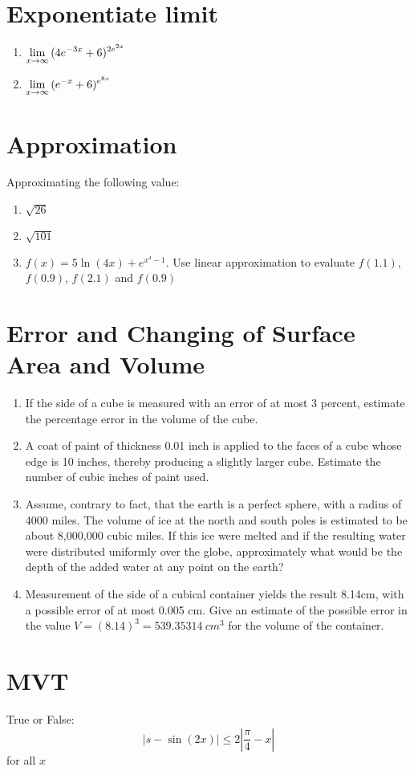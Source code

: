 	\section{Exponentiate limit}
	\begin{enumerate}
		\item $\displaystyle \lim_{x \to \infty}{(4e^{-3x}+6)^{2e^{2x}}}$
		\vskip 5cm
		\item $\displaystyle \lim_{x \to \infty}{(e^{-x}+6)^{e^{8x}}}$
		\vskip 5cm

	\end{enumerate}

	\section{Approximation}
	Approximating the following value:
	\begin{enumerate}
		\item $\sqrt{26}$
		\vskip 4cm
		\item $\sqrt{101}$
		\vskip 4cm 
		\item $f(x)=5\ln(4x)+e^{x^4-1}$. Use linear approximation to evaluate $f(1.1)$, $f(0.9)$, $f(2.1)$ and $f(0.9)$
		\newpage
		
	\end{enumerate}
	\section{Error and Changing of Surface Area and Volume}
	\begin{enumerate}
		\item If the side of a cube is measured with an error of at most 3 percent, estimate the percentage error in the volume of the cube.
		\vskip 5cm
		\item A coat of paint of thickness 0.01 inch is applied to the faces of a cube whose edge is 10 inches, thereby producing a slightly larger cube. Estimate the number of cubic inches of paint used.
		\vskip 5cm 
		\item Assume, contrary to fact, that the earth is a perfect sphere, with a radius of 4000 miles. The volume of ice at the north and south poles is estimated to be about 8,000,000 cubic miles. If this ice were melted and if the resulting water were distributed uniformly over the globe, approximately what would be the depth of the added water at any point on the earth?
		\vskip 5cm 
		\item Measurement of the side of a cubical container yields the result 8.14cm, with a possible error of at most 0.005 cm. Give an estimate of the possible error in the value $V= (8.14)^3 = 539.35314 \ cm^3$ for the volume of the container.
	\end{enumerate}
	\section{MVT}
	True or False:
	$$|s-\sin(2x)|\leq 2|\frac{\pi}{4}-x|$$
	for all $x$

